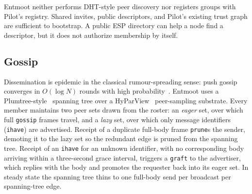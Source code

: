 \documentclass[11pt,a4paper,twocolumn]{article}
\begin{document}
Entmoot neither performs DHT-style peer discovery nor registers groups with
Pilot's registry. Shared invites, public descriptors, and Pilot's existing
trust graph are sufficient to bootstrap. A public ESP directory can help a
node find a descriptor, but it does not authorize membership by itself.

\subsection{Gossip}
\label{sec:gossip}

Dissemination is epidemic in the classical rumour-spreading sense:
push gossip converges in $O(\log N)$ rounds with high
probability~\citep{karp2000rumor,demers1987epidemic}. Entmoot uses
a Plumtree-style~\citep{leitao2007plumtree} spanning tree over a
HyParView~\citep{leitao2007hyparview} peer-sampling substrate.
Every member maintains two peer sets drawn from the roster: an
\emph{eager} set, over which full \texttt{gossip} frames travel,
and a \emph{lazy} set, over which only message identifiers
(\texttt{ihave}) are advertised. Receipt of a duplicate full-body
frame \texttt{prune}s the sender, demoting it to the lazy set so
the redundant edge is pruned from the spanning tree. Receipt of an
\texttt{ihave} for an unknown identifier, with no corresponding
body arriving within a three-second grace interval, triggers a
\texttt{graft} to the advertiser, which replies with the body and
promotes the requester back into its eager set. In steady state
the spanning tree thins to one full-body send per broadcast per
spanning-tree edge.
\end{document}
